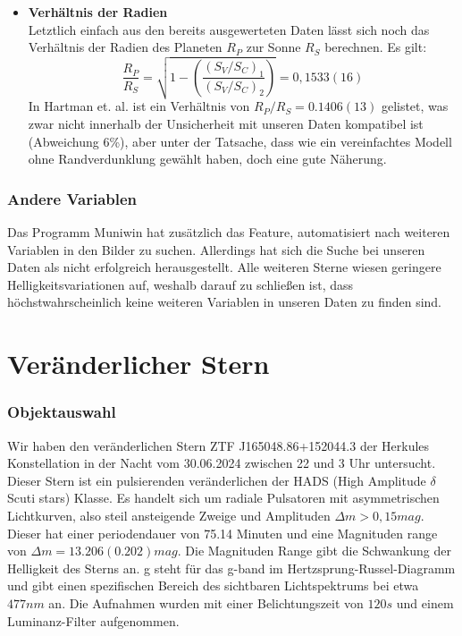 \documentclass[ngerman,ruledheaders=section,class=report,thesis={type=Protokoll},accentcolor=1b,marginpar=false,parskip=half-,fontsize=11pt,]{tudapub}
\begin{document}
\begin{itemize}
		\item \textbf{Verhältnis der Radien} \\
		Letztlich einfach aus den bereits ausgewerteten Daten lässt sich noch das Verhältnis der Radien des Planeten $R_P$ zur Sonne $R_S$ berechnen. Es gilt:
		\begin{equation}
			\frac{R_P}{R_S} = \sqrt{1 - \left( \frac{(S_V / S_C)_1}{(S_V / S_C)_2}\right)} = 0,1533(16)
		\end{equation}
		In Hartman et. al. \cite{hartman2009hat} ist ein Verhältnis von $R_P / R_S = 0.1406(13)$ gelistet, was zwar nicht innerhalb der Unsicherheit mit unseren Daten kompatibel ist (Abweichung 6\%), aber unter der Tatsache, dass wie ein vereinfachtes Modell ohne Randverdunklung gewählt haben, doch eine gute Näherung.  
	\end{itemize}
	\subsection{Andere Variablen}
	Das Programm Muniwin hat zusätzlich das Feature, automatisiert nach weiteren Variablen in den Bilder zu suchen. Allerdings hat sich die Suche bei unseren Daten als nicht erfolgreich herausgestellt. Alle weiteren Sterne wiesen geringere Helligkeitsvariationen auf, weshalb darauf zu schließen ist, dass höchstwahrscheinlich keine weiteren Variablen in unseren Daten zu finden sind. 
	
	
	
\chapter{Veränderlicher Stern} 
	
\subsection{Objektauswahl} 
Wir haben den veränderlichen Stern ZTF J165048.86+152044.3 der Herkules Konstellation in der Nacht vom 30.06.2024 zwischen 22 und 3 Uhr untersucht.
Dieser Stern ist ein pulsierenden veränderlichen der HADS (High Amplitude $\delta$ Scuti stars) Klasse. Es handelt sich um radiale Pulsatoren mit asymmetrischen Lichtkurven, also steil ansteigende Zweige und Amplituden $\Delta m > 0,15 \si{mag}$.
Dieser hat einer periodendauer von 75.14 Minuten und eine Magnituden range von $\Delta m =13.206 (0.202)\si{mag}$. Die Magnituden Range gibt die Schwankung der Helligkeit des Sterns an. g steht für das g-band im Hertzsprung-Russel-Diagramm und gibt einen spezifischen Bereich des sichtbaren Lichtspektrums bei etwa $477 \si{nm}$ an.
Die Aufnahmen wurden mit einer Belichtungszeit von $120\si{s}$ und einem Luminanz-Filter aufgenommen.
	
\end{document}
